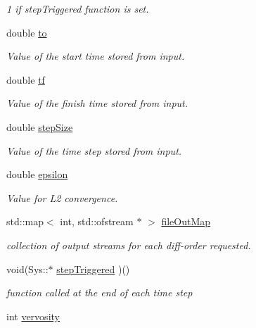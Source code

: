 \begin{DoxyCompactItemize}
\begin{DoxyCompactList}\small\item\em 1 if step\-Triggered function is set. \end{DoxyCompactList}\item 
double \hyperlink{classlmx_1_1DiffProblem_a760ffa595e70cae2531f3216aac6c46e}{to}
\begin{DoxyCompactList}\small\item\em Value of the start time stored from input. \end{DoxyCompactList}\item 
double \hyperlink{classlmx_1_1DiffProblem_a6b58fb60128a6c764f641d8c3fa27bf2}{tf}
\begin{DoxyCompactList}\small\item\em Value of the finish time stored from input. \end{DoxyCompactList}\item 
double \hyperlink{classlmx_1_1DiffProblem_a618e5cd5bfc0fcdf581688a19f6d8f8f}{step\-Size}
\begin{DoxyCompactList}\small\item\em Value of the time step stored from input. \end{DoxyCompactList}\item 
double \hyperlink{classlmx_1_1DiffProblem_aeb9570709f636d15d2636cbe5d6a8f5b}{epsilon}
\begin{DoxyCompactList}\small\item\em Value for L2 convergence. \end{DoxyCompactList}\item 
std\-::map$<$ int, std\-::ofstream $\ast$ $>$ \hyperlink{classlmx_1_1DiffProblem_aed830db025433747c8190c8a77db75d5}{file\-Out\-Map}
\begin{DoxyCompactList}\small\item\em collection of output streams for each diff-\/order requested. \end{DoxyCompactList}\item 
void(Sys\-::$\ast$ \hyperlink{classlmx_1_1DiffProblem_a57aca09c09bd4d8ce9913bf07b88f135}{step\-Triggered} )()
\begin{DoxyCompactList}\small\item\em function called at the end of each time step \end{DoxyCompactList}\item 
int \hyperlink{classlmx_1_1DiffProblem_a9c30436b4fe89c4da9ceb9194191a6b0}{vervosity}
\end{DoxyCompactItemize}


